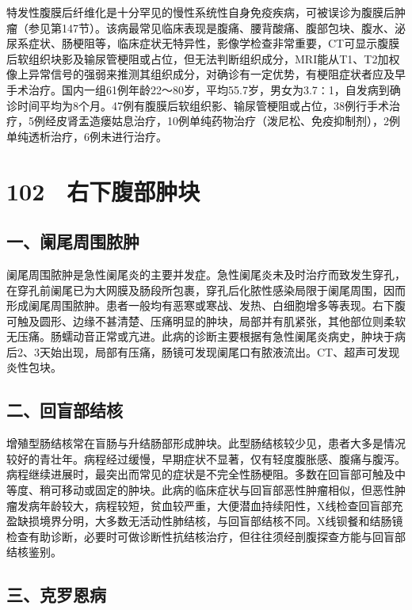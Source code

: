 特发性腹膜后纤维化是十分罕见的慢性系统性自身免疫疾病，可被误诊为腹膜后肿瘤（参见第147节）。该病最常见临床表现是腹痛、腰背酸痛、腹部包块、腹水、泌尿系症状、肠梗阻等，临床症状无特异性，影像学检查非常重要，CT可显示腹膜后软组织块影及输尿管梗阻或占位，但无法判断组织成分，MRI能从T1、T2加权像上异常信号的强弱来推测其组织成分，对确诊有一定优势，有梗阻症状者应及早手术治疗。国内一组61例年龄22～80岁，平均55.7岁，男女为3.7∶1，自发病到确诊时间平均为8个月。47例有腹膜后软组织影、输尿管梗阻或占位，38例行手术治疗，5例经皮肾盂造瘘姑息治疗，10例单纯药物治疗（泼尼松、免疫抑制剂），2例单纯透析治疗，6例未进行治疗。

\protect\hypertarget{text00233.html}{}{}

\section{102　右下腹部肿块}

\subsection{一、阑尾周围脓肿}

阑尾周围脓肿是急性阑尾炎的主要并发症。急性阑尾炎未及时治疗而致发生穿孔，在穿孔前阑尾已为大网膜及肠段所包裹，穿孔后化脓性感染局限于阑尾周围，因而形成阑尾周围脓肿。患者一般均有恶寒或寒战、发热、白细胞增多等表现。右下腹可触及圆形、边缘不甚清楚、压痛明显的肿块，局部并有肌紧张，其他部位则柔软无压痛。肠蠕动音正常或亢进。此病的诊断主要根据有急性阑尾炎病史，肿块于病后2、3天始出现，局部有压痛，肠镜可发现阑尾口有脓液流出。CT、超声可发现炎性包块。

\subsection{二、回盲部结核}

增殖型肠结核常在盲肠与升结肠部形成肿块。此型肠结核较少见，患者大多是情况较好的青壮年。病程经过缓慢，早期症状不显著，仅有轻度腹胀感、腹痛与腹泻。病程继续进展时，最突出而常见的症状是不完全性肠梗阻。多数在回盲部可触及中等度、稍可移动或固定的肿块。此病的临床症状与回盲部恶性肿瘤相似，但恶性肿瘤发病年龄较大，病程较短，贫血较严重，大便潜血持续阳性，X线检查回盲部充盈缺损境界分明，大多数无活动性肺结核，与回盲部结核不同。X线钡餐和结肠镜检查有助诊断，必要时可做诊断性抗结核治疗，但往往须经剖腹探查方能与回盲部结核鉴别。

\subsection{三、克罗恩病}

